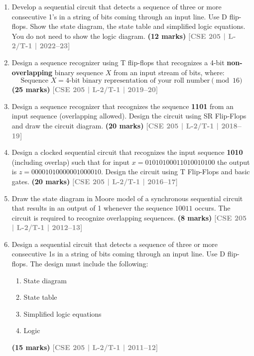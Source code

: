 \documentclass[12pt,a3paper]{article}
\newcommand{\yr}[1]{\hfill\textcolor{gray}{\small\textbf{[#1]}}}
\newcommand{\mk}[1]{\textcolor{orange!70!black}{\small\textbf{(#1 marks)}}}
\begin{document}
\begin{enumerate}

\item Develop a sequential circuit that detects a sequence of three or more consecutive 1's in a string of bits coming through an input line. Use D flip-flops. Show the state diagram, the state table and simplified logic equations. You do not need to show the logic diagram.
\mk{12} \yr{CSE 205 | L-2/T-1 | 2022--23}

\item Design a sequence recognizer using T flip-flops that recognizes a 4-bit \textbf{non-overlapping} binary sequence $X$ from an input stream of bits, where:
\[ \text{Sequence } X = \text{4-bit binary representation of your roll number} \pmod{16} \]
\mk{25} \yr{CSE 205 | L-2/T-1 | 2019--20}



\item Design a sequence recognizer that recognizes the sequence \textbf{1101} from an input sequence (overlapping allowed). Design the circuit using SR Flip-Flops and draw the circuit diagram.
\mk{20} \yr{CSE 205 | L-2/T-1 | 2018--19}



\item Design a clocked sequential circuit that recognizes the input sequence \textbf{1010} (including overlap) such that for input $x = 01010100011010010100$ the output is $z = 00001010000001000010$. Design the circuit using T Flip-Flops and basic gates.
\mk{20} \yr{CSE 205 | L-2/T-1 | 2016--17}

\item Draw the state diagram in Moore model of a synchronous sequential circuit that results in an output of 1 whenever the sequence $10011$ occurs. The circuit is required to recognize overlapping sequences.
\mk{8} \yr{CSE 205 | L-2/T-1 | 2012--13}

\item Design a sequential circuit that detects a sequence of three or more consecutive 1s in a string of bits coming through an input line. Use D flip-flops. The design must include the following:
\begin{enumerate}
  \item State diagram
  \item State table
  \item Simplified logic equations
  \item Logic 
  

  \end{enumerate}
\mk{15} \yr{CSE 205 | L-2/T-1 | 2011--12}
\end{enumerate}
\end{document}
